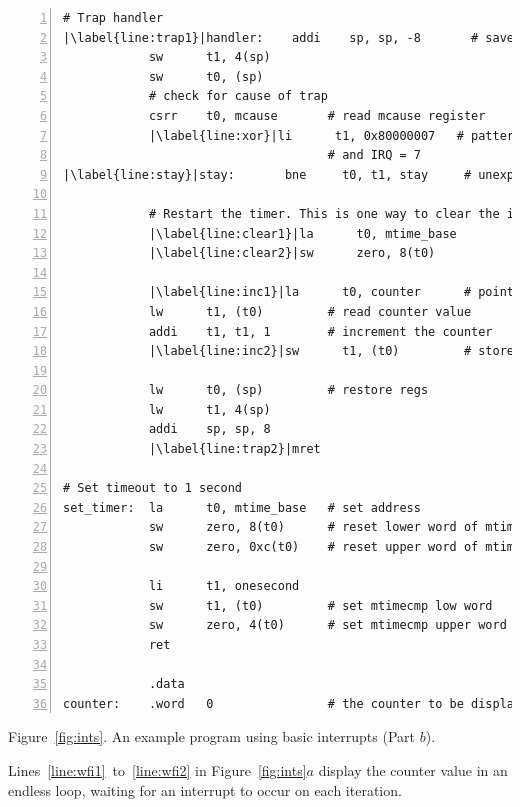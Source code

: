 \documentclass[11pt, twoside, pdftex]{article}
\begin{document}
\begin{center}
\begin{minipage}[h]{15 cm}
\begin{lstlisting}[style=defaultNiosVStyle, name=ints, numbers=left, escapechar=|]
# Trap handler
|\label{line:trap1}|handler:    addi    sp, sp, -8       # save regs that will be modified
            sw      t1, 4(sp)
            sw      t0, (sp)
            # check for cause of trap
            csrr    t0, mcause       # read mcause register
            |\label{line:xor}|li      t1, 0x80000007   # pattern to check interrupt bit
                                     # and IRQ = 7
|\label{line:stay}|stay:       bne     t0, t1, stay     # unexpected cause of exception
            
            # Restart the timer. This is one way to clear the interrupt
            |\label{line:clear1}|la      t0, mtime_base
            |\label{line:clear2}|sw      zero, 8(t0)

            |\label{line:inc1}|la      t0, counter      # pointer to counter
            lw      t1, (t0)         # read counter value
            addi    t1, t1, 1        # increment the counter
            |\label{line:inc2}|sw      t1, (t0)         # store counter to memory

            lw      t0, (sp)         # restore regs
            lw      t1, 4(sp)
            addi    sp, sp, 8
            |\label{line:trap2}|mret

# Set timeout to 1 second
set_timer:  la      t0, mtime_base   # set address
            sw      zero, 8(t0)      # reset lower word of mtime
            sw      zero, 0xc(t0)    # reset upper word of mtime
            
            li      t1, onesecond
            sw      t1, (t0)         # set mtimecmp low word
            sw      zero, 4(t0)      # set mtimecmp upper word
            ret
     
            .data
counter:    .word   0                # the counter to be displayed\end{lstlisting}

\vspace{0.25in}
Figure~\ref{fig:ints}.	An example program using basic interrupts (Part $b$).
\end{minipage}
\end{center}

Lines~\ref{line:wfi1}~to~\ref{line:wfi2} in Figure~\ref{fig:ints}$a$ 
display the counter value in an endless loop,
waiting for an interrupt to occur on each iteration. 
\end{document}
